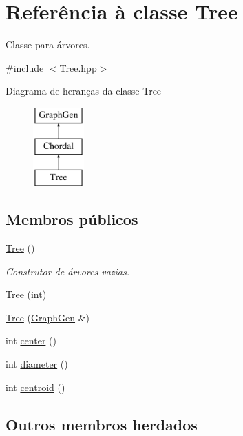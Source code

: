 \hypertarget{classTree}{}\section{Referência à classe Tree}
\label{classTree}


Classe para árvores.  




{\ttfamily \#include $<$Tree.\+hpp$>$}

Diagrama de heranças da classe Tree\begin{figure}[H]
\begin{center}
\leavevmode
\includegraphics[height=3.000000cm]{classTree}
\end{center}
\end{figure}
\subsection*{Membros públicos}
\begin{DoxyCompactItemize}
\item 
\mbox{\label{classTree_ad376a7c639d857312f5de2ef47482f68}} 
\hyperlink{classTree_ad376a7c639d857312f5de2ef47482f68}{Tree} ()
\begin{DoxyCompactList}\small\item\em Construtor de árvores vazias. \end{DoxyCompactList}\item 
\hyperlink{classTree_a25977c120f94e833fdd7739daa9b8d89}{Tree} (int)
\item 
\hyperlink{classTree_a9f7d6a13c19b6525ee504079a5ffbd8e}{Tree} (\hyperlink{classGraphGen}{Graph\+Gen} \&)
\item 
int \hyperlink{classTree_af13c3d7650185d8703c5483d3b24a5e5}{center} ()
\item 
int \hyperlink{classTree_a8a296a740609d29e4ff991549b7f8f92}{diameter} ()
\item 
int \hyperlink{classTree_a568a379c4a528faf192b2a97ac3a20bb}{centroid} ()
\end{DoxyCompactItemize}
\subsection*{Outros membros herdados}


